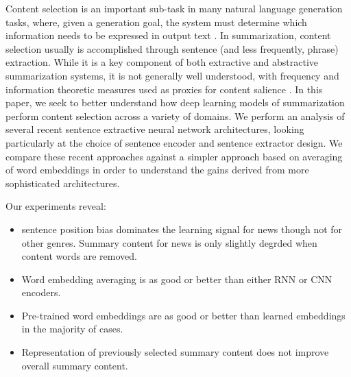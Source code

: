 Content selection is an important sub-task in many natural language generation
tasks,
where, given a generation goal, the system must determine which information
needs to be expressed in output text \cite{gatt2018survey}.
In summarization, content selection usually is accomplished through sentence (and
less frequently, phrase) extraction.
 While it is a key component of both
extractive and abstractive summarization systems, it is not generally well 
understood, with frequency and information theoretic measures used as proxies
for content salience \cite{hong2014improving}. 
In this paper, we seek to better understand how deep learning models of 
summarization perform content selection across a variety of domains.
We perform an analysis 
of several recent sentence extractive neural network architectures, 
looking particularly at the choice of sentence encoder and sentence 
extractor design. We compare these recent approaches  against
a simpler approach based on averaging of word embeddings in order to understand
the gains derived from more sophisticated architectures.



Our experiments reveal:
\begin{itemize}
\item sentence position bias dominates the learning signal for news though not for
other genres. Summary content for news is only slightly degrded when content words
are removed. 
\item Word embedding averaging is as good or better than either RNN or CNN encoders.
\item Pre-trained word embeddings are as good or better than learned embeddings in the majority of cases.
\item Representation of previously selected summary content does not improve overall summary content. 
\end{itemize} 

